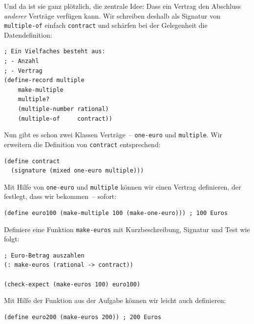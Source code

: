 Und da ist sie ganz plötzlich, die zentrale Idee: Dass ein Vertrag den
Abschluss \emph{anderer} Ver\-träge verfügen kann.  Wir schreiben
deshalb als Signatur von \lstinline{multiple-of} einfach
\lstinline{contract} und schärfen bei der Gelegenheit die Datendefinition:
%
\begin{lstlisting}
; Ein Vielfaches besteht aus:
; - Anzahl
; - Vertrag 
(define-record multiple
    make-multiple
    multiple?
    (multiple-number rational)
    (multiple-of     contract))
\end{lstlisting}
%
Nun gibt es schon zwei Klassen Verträge~-- \lstinline{one-euro} und
\lstinline{multiple}.  Wir erweitern die Definition von
\lstinline{contract} entsprechend:
%
\begin{lstlisting}
(define contract
  (signature (mixed one-euro multiple)))
\end{lstlisting}
%
Mit Hilfe von \lstinline{one-euro} und \lstinline{multiple} können wir
einen Vertrag definieren, der festlegt, dass wir  bekommen~--
sofort:
%
\begin{lstlisting}
(define euro100 (make-multiple 100 (make-one-euro))) ; 100 Euros
\end{lstlisting}
%
\begin{aufgabeinline}
  Definiere eine Funktion \lstinline{make-euros} mit Kurzbeschreibung,
  Signatur und Test wie folgt:
\begin{lstlisting}
; Euro-Betrag auszahlen
(: make-euros (rational -> contract))

(check-expect (make-euros 100) euro100)
\end{lstlisting}
\end{aufgabeinline}
%
Mit Hilfe der Funktion aus der Aufgabe können wir leicht auch
 definieren:
%
\begin{lstlisting}
(define euro200 (make-euros 200)) ; 200 Euros
\end{lstlisting}

